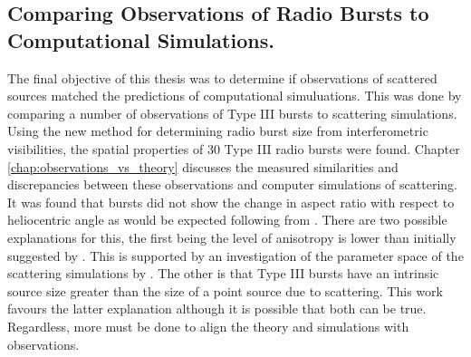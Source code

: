 \subsection{Comparing Observations of Radio Bursts to Computational Simulations.}
The final objective of this thesis was to determine if observations of scattered sources matched the predictions of computational simuluations. This was done by comparing a number of observations of Type III bursts to scattering simulations.
Using the new method for determining radio burst size from interferometric visibilities, the spatial properties of 30 Type III radio bursts were found. Chapter \ref{chap:observations_vs_theory} discusses the measured similarities and discrepancies between these observations and computer simulations of scattering. It was found that bursts did not show the change in aspect ratio with respect to heliocentric angle as would be expected following from \cite{Kontar2019}. There are two possible explanations for this, the first being the level of anisotropy is lower than initially suggested by \cite{Kontar2019}. This is supported by an investigation of the parameter space of the scattering simulations by \cite{Zhang2021}. The other is that Type III bursts have an intrinsic source size greater than the size of a point source due to scattering. This work favours the latter explanation although it is possible that both can be true. Regardless, more must be done to align the theory and simulations with observations.

